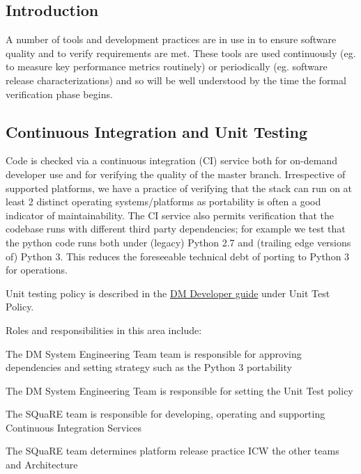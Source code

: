 

\subsection{Introduction}

A number of tools and development practices are in use in \product to ensure software quality and to verify requirements are met. These tools are used continuously (eg. to measure key performance metrics routinely) or periodically (eg. software release characterizations) and so will be well understood by the time the formal verification phase begins. 

\subsection{Continuous Integration and Unit Testing}
 
Code is checked via a continuous integration (CI) service both for on-demand developer use and for verifying the quality of the master branch. Irrespective of supported platforms, we have a practice of verifying that the stack can run on at least 2 distinct operating systems/platforms as portability is often a good indicator of maintainability. The CI service also permits verification that the codebase runs with different third party dependencies; for example we test that the python code runs both under (legacy) Python 2.7 and (trailing edge versions of) Python 3. This reduces the foreseeable technical debt of porting to Python 3 for operations.
 
Unit testing policy is described in the \href{https://developer.lsst.io}{DM Developer guide} under Unit Test Policy.
 
Roles and responsibilities in this area include:

\begin{itemize_single}
  
\item The DM System Engineering Team  team is responsible for approving dependencies and setting strategy such as the Python 3 portability

\item The DM System Engineering  Team is responsible for setting the Unit Test policy

\item The SQuaRE team is responsible for developing, operating and supporting Continuous Integration Services

\item The SQuaRE team determines platform release practice ICW the other teams and Architecture
  
\end{itemize_single}

